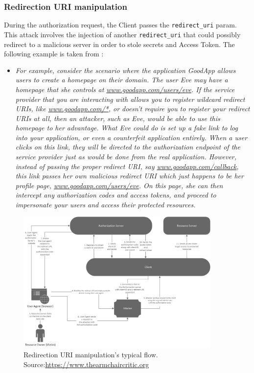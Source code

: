 \documentclass[a4paper,12pt]{article}
\begin{document}
\subsubsection{Redirection URI manipulation}
During the authorization request, the Client passes the \texttt{redirect\_uri} param. This attack involves the injection of another \texttt{redirect\_uri} that could possibly redirect to a malicious server in order to stole secrets and Access Token. The following example is taken from \cite{mastering}:

\begin{itemize}
    \item[] \textit{For example, consider the scenario where the application GoodApp allows users to create a homepage on their domain. The user Eve may have a homepage that she controls at \url{www.goodapp.com/users/eve}. If the service provider that you are interacting with allows you to register wildcard redirect URIs, like \url{www.goodapp.com/*}, or doesn't require you to register your redirect URIs at all, then an attacker, such as Eve, would be able to use this homepage to her advantage. What Eve could do is set up a fake link to log into your application, or even a counterfeit application entirely. When a user clicks on this link, they will be directed to the authorization endpoint of the service provider just as would be done from the real application. However, instead of passing the proper redirect URI, say \url{www.goodapp.com/callback}, this link passes her own malicious redirect URI which just happens to be her profile page, \url{www.goodapp.com/users/eve}. On this page, she can then intercept any authorization codes and access tokens, and proceed to impersonate your users and access their protected resources.}
\end{itemize}

\begin{figure}[ht]
    \centering
    \includegraphics[width=0.9\textwidth]{figures/authCodeURIAttack.png}
    \caption[Redirection URI manipulation's typical flow]{Redirection URI manipulation's typical flow.\\Source:\hspace{0.2cm}\url{https://www.thearmchaircritic.org}}
    \label{fig:reduri}
\end{figure}
\end{document}
